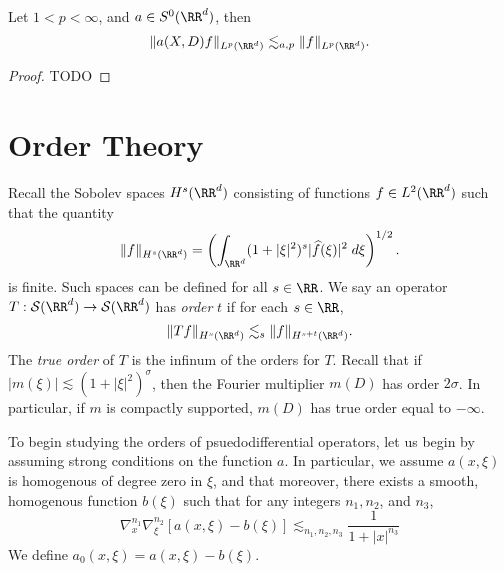 \begin{theorem}
  Let $1 < p < \infty$, and $a \in S^0(\RR^d)$, then
  \[ \| a(X,D) f \|_{L^p(\RR^d)} \lesssim_{a,p} \| f \|_{L^p(\RR^d)}. \]
\end{theorem}
\begin{proof}
  TODO
\end{proof}

\section{Order Theory}

Recall the Sobolev spaces $H^s(\RR^d)$ consisting of functions $f \in L^2(\RR^d)$ such that the quantity
%
\[ \| f \|_{H^s(\RR^d)} = \left( \int_{\RR^d} (1 + |\xi|^2)^s |\widehat{f}(\xi)|^2\; d\xi \right)^{1/2}. \]
%
is finite. Such spaces can be defined for all $s \in \RR$. We say an operator $T: \mathcal{S}(\RR^d) \to \mathcal{S}(\RR^d)$ has \emph{order} $t$ if for each $s \in \RR$,
%
\[ \| Tf \|_{H^s(\RR^d)} \lesssim_s \| f \|_{H^{s+t}(\RR^d)}. \]
%
The \emph{true order} of $T$ is the infinum of the orders for $T$. Recall that if $|m(\xi)| \lesssim (1 + |\xi|^2)^\sigma$, then the Fourier multiplier $m(D)$ has order $2\sigma$. In particular, if $m$ is compactly supported, $m(D)$ has true order equal to $-\infty$.

To begin studying the orders of psuedodifferential operators, let us begin by assuming strong conditions on the function $a$. In particular, we assume $a(x,\xi)$ is homogenous of degree zero in $\xi$, and that moreover, there exists a smooth, homogenous function $b(\xi)$ such that for any integers $n_1,n_2$, and $n_3$,
%
\[ \nabla^{n_1}_x \nabla^{n_2}_\xi[a(x,\xi) - b(\xi)] \lesssim_{n_1,n_2,n_3} \frac{1}{1 + |x|^{n_3}} \]
%
We define $a_0(x,\xi) = a(x,\xi) - b(\xi)$.

